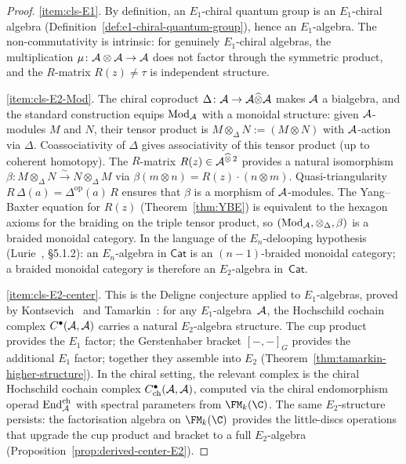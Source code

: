 \begin{proof}
\ref{item:cls-E1}.
By definition, an $E_1$-chiral quantum group is an
$E_1$-chiral algebra
(Definition~\ref{def:e1-chiral-quantum-group}), hence
an $E_1$-algebra. The non-commutativity is intrinsic: for
genuinely $E_1$-chiral algebras, the multiplication
$\mu \colon \mathcal{A} \otimes \mathcal{A} \to \mathcal{A}$ does not factor
through the symmetric product, and the $R$-matrix
$R(z) \neq \tau$ is independent structure.

\medskip
\noindent\ref{item:cls-E2-Mod}.
The chiral coproduct $\Delta \colon \mathcal{A} \to
\mathcal{A} \widehat\otimes \mathcal{A}$ makes $\mathcal{A}$ a bialgebra, and
the standard construction equips $\mathrm{Mod}_{\mathcal{A}}$ with
a monoidal structure: given $\mathcal{A}$-modules $M$ and $N$,
their tensor product is
$M \otimes_\Delta N := (M \otimes N)$ with $\mathcal{A}$-action via
$\Delta$. Coassociativity of $\Delta$ gives associativity
of this tensor product (up to coherent homotopy). The
$R$-matrix $R(z) \in \mathcal{A}^{\widehat\otimes\,2}$ provides a
natural isomorphism
$\beta \colon M \otimes_\Delta N \xrightarrow{\sim}
N \otimes_\Delta M$
via $\beta(m \otimes n) = R(z) \cdot (n \otimes m)$.
Quasi-triangularity
$R\,\Delta(a) = \Delta^{\mathrm{op}}(a)\,R$ ensures that
$\beta$ is a morphism of $\mathcal{A}$-modules. The Yang--Baxter
equation for $R(z)$
(Theorem~\ref{thm:YBE}) is equivalent to the hexagon
axioms for the braiding on the triple tensor product,
so $(\mathrm{Mod}_{\mathcal{A}}, \otimes_\Delta, \beta)$ is a
braided monoidal category. In the language of the
$E_n$-delooping hypothesis
(Lurie~\cite{HA}, \S5.1.2): an $E_n$-algebra in
$\mathsf{Cat}$ is an $(n{-}1)$-braided monoidal category;
a braided monoidal category is therefore an $E_2$-algebra
in~$\mathsf{Cat}$.

\medskip
\noindent\ref{item:cls-E2-center}.
This is the Deligne conjecture applied to
$E_1$-algebras, proved by
Kontsevich~\cite{Kon03} and
Tamarkin~\cite{Tamarkin00}:
for any $E_1$-algebra~$\mathcal{A}$, the Hochschild cochain complex
$C^\bullet(\mathcal{A}, \mathcal{A})$ carries a natural $E_2$-algebra
structure. The cup product provides the $E_1$ factor;
the Gerstenhaber bracket $[-,-]_G$ provides the additional
$E_1$ factor; together they assemble into $E_2$
(Theorem~\ref{thm:tamarkin-higher-structure}).
In the chiral setting, the relevant complex is the
chiral Hochschild cochain complex
$C^\bullet_{\mathrm{ch}}(\mathcal{A}, \mathcal{A})$, computed via the
chiral endomorphism operad $\mathrm{End}^{\mathrm{ch}}_{\mathcal{A}}$
with spectral parameters from $\FM_k(\C)$.
The same $E_2$-structure persists: the factorisation
algebra on $\FM_k(\C)$ provides the little-discs operations
that upgrade the cup product and bracket to a full
$E_2$-algebra
(Proposition~\ref{prop:derived-center-E2}).


\end{proof}

